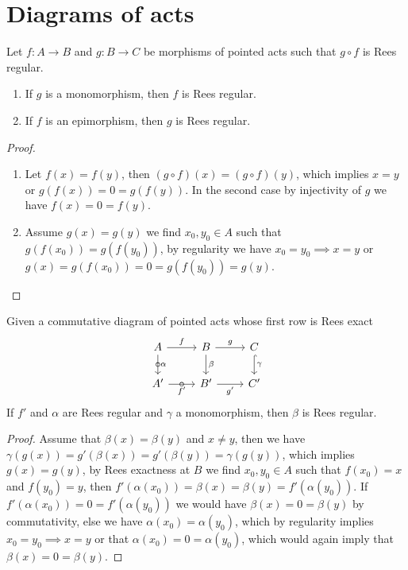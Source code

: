 \chapter{Diagrams of acts}
\begin{proposition}\label{regprop}
    Let $f : A\to B$ and $g: B\to C$ be morphisms of pointed acts such that $g\circ f$ is Rees regular.
    \begin{enumerate}
        \item If $g$ is a monomorphism, then $f$ is Rees regular.
        \item If $f$ is an epimorphism, then $g$ is Rees regular.
    \end{enumerate}
\end{proposition}
\begin{proof}[Proof]
    \begin{enumerate}
       \item Let $f(x)=f(y)$, then $(g\circ f)(x)=(g\circ f)(y)$, which implies $x=y$ or 
       $g(f(x))=0=g(f(y))$. In the second case by injectivity of $g$ we have $f(x)=0=f(y)$.
       \item Assume $g(x)=g(y)$ we find $x_0,y_0\in A$ such that $g(f(x_0))=g(f(y_0))$, by regularity
       we have $x_0=y_0 \implies x=y$ or $g(x)=g(f(x_0))= 0 = g(f(y_0))=g(y)$.
    \end{enumerate}
\end{proof}
\begin{lemma}\label{reglemma1}
    Given a commutative diagram of pointed acts whose first row is Rees exact
    \[\begin{tikzcd}
        A & B & C \\
        {A'} & {B'} & {C'}
        \arrow["f", from=1-1, to=1-2]
        \arrow["\alpha", "\circ"{marking}, from=1-1, to=2-1]
        \arrow["g", from=1-2, to=1-3]
        \arrow["\beta", from=1-2, to=2-2]
        \arrow["\gamma", hook, from=1-3, to=2-3]
        \arrow["{f'}"', "\circ"{marking}, from=2-1, to=2-2]
        \arrow["{g'}"', from=2-2, to=2-3]
    \end{tikzcd}\]
    If $f'$ and $\alpha$ are Rees regular and $\gamma$ a monomorphism, then $\beta$ is Rees regular.
\end{lemma}
\begin{proof}[Proof]
    Assume that $\beta(x)=\beta(y)$ and $x\neq y$, then we have $\gamma(g(x))=g'(\beta(x))=g'(\beta(y))=\gamma(g(y))$, which 
    implies $g(x)=g(y)$, by Rees exactness at $B$ we find $x_0,y_0\in A$ such that $f(x_0)=x$ and $f(y_0)=y$, then 
    $f'(\alpha(x_0))=\beta(x)=\beta(y)=f'(\alpha(y_0))$. If $f'(\alpha(x_0)) =0 = f'(\alpha(y_0))$ we would have 
    $\beta(x) = 0 = \beta(y)$ by commutativity, else we have $\alpha(x_0)=\alpha(y_0)$, which by regularity implies
    $x_0=y_0\implies x=y$ or that $\alpha(x_0)=0=\alpha(y_0)$, which would again imply that $\beta(x)=0=\beta(y)$.
\end{proof}

